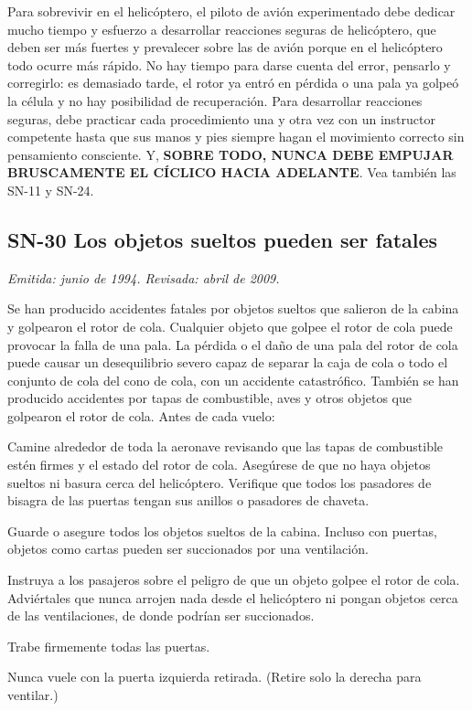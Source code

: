 Para sobrevivir en el helicóptero, el piloto de avión experimentado debe dedicar mucho tiempo y esfuerzo a desarrollar reacciones seguras de helicóptero, que deben ser más fuertes y prevalecer sobre las de avión porque en el helicóptero todo ocurre más rápido. No hay tiempo para darse cuenta del error, pensarlo y corregirlo: es demasiado tarde, el rotor ya entró en pérdida o una pala ya golpeó la célula y no hay posibilidad de recuperación. Para desarrollar reacciones seguras, debe practicar cada procedimiento una y otra vez con un instructor competente hasta que sus manos y pies siempre hagan el movimiento correcto sin pensamiento consciente. Y, \textbf{SOBRE TODO, NUNCA DEBE EMPUJAR BRUSCAMENTE EL CÍCLICO HACIA ADELANTE}. Vea también las SN-11 y SN-24.

\subsection*{SN-30 \quad Los objetos sueltos pueden ser fatales}
{\small\textit{Emitida: junio de 1994. Revisada: abril de 2009.}}

Se han producido accidentes fatales por objetos sueltos que salieron de la cabina y golpearon el rotor de cola. Cualquier objeto que golpee el rotor de cola puede provocar la falla de una pala. La pérdida o el daño de una pala del rotor de cola puede causar un desequilibrio severo capaz de separar la caja de cola o todo el conjunto de cola del cono de cola, con un accidente catastrófico. También se han producido accidentes por tapas de combustible, aves y otros objetos que golpearon el rotor de cola. Antes de cada vuelo:

\begin{pasos}
\item Camine alrededor de toda la aeronave revisando que las tapas de combustible estén firmes y el estado del rotor de cola. Asegúrese de que no haya objetos sueltos ni basura cerca del helicóptero. Verifique que todos los pasadores de bisagra de las puertas tengan sus anillos o pasadores de chaveta.
\item Guarde o asegure todos los objetos sueltos de la cabina. Incluso con puertas, objetos como cartas pueden ser succionados por una ventilación.
\item Instruya a los pasajeros sobre el peligro de que un objeto golpee el rotor de cola. Adviértales que nunca arrojen nada desde el helicóptero ni pongan objetos cerca de las ventilaciones, de donde podrían ser succionados.
\item Trabe firmemente todas las puertas.
\item Nunca vuele con la puerta izquierda retirada. (Retire solo la derecha para ventilar.)
\end{pasos}

